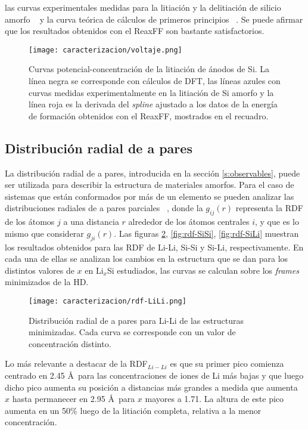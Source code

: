 las curvas experimentales medidas para la litiación y la delitiación de silicio
amorfo ~\cite{hatchard2004} y la curva teórica de cálculos de primeros principios 
~\cite{chevrier2009}. Se puede afirmar que los resultados obtenidos con el ReaxFF 
son bastante satisfactorios.
\begin{figure}[th]
    \centering
    \texttt{[image: caracterizacion/voltaje.png]}
    \caption{Curvas potencial-concentración de la litiación de ánodos de Si.
    La línea negra se corresponde con cálculos de DFT, las líneas azules con 
    curvas medidas experimentalmente en la litiación de Si amorfo y la línea 
    roja es la derivada del \textit{spline} ajustado a los datos de la energía 
    de formación obtenidos con el ReaxFF, mostrados en el recuadro.}
    \label{fig:voltaje}
\end{figure}

\subsection{Distribución radial de a pares}

La distribución radial de a pares, introducida en la sección \ref{s:observables},
puede ser utilizada para describir la estructura de materiales amorfos. Para el 
caso de sistemas que están conformados por más de un elemento se pueden analizar 
las distribuciones radiales de a pares parciales ~\cite{lamparter1995}, donde la 
$g_{ij}(r)$ representa la RDF de los átomos $j$ a una distancia $r$ alrededor de 
los átomos centrales $i$, y que es lo mismo que considerar $g_{ji}(r)$. Las 
figuras \ref{fig:rdf-LiLi}, \ref{fig:rdf-SiSi}, \ref{fig:rdf-SiLi} muestran los
resultados obtenidos para las RDF de Li-Li, Si-Si y Si-Li, respectivamente. En
cada una de ellas se analizan los cambios en la estructura que se dan para los
distintos valores de $x$ en Li$_x$Si estudiados, las curvas se calculan sobre los
\textit{frames} minimizados de la HD.

\begin{figure}[h!]
    \centering
    \texttt{[image: caracterizacion/rdf-LiLi.png]}
    \caption{Distribución radial de a pares para Li-Li de las estructuras 
    minimizadas. Cada curva se corresponde con un valor de concentración 
    distinto.}
    \label{fig:rdf-LiLi}
\end{figure}
Lo más relevante a destacar de la RDF$_{Li-Li}$ es que su primer pico comienza 
centrado en 2.45 \AA\ para las concentraciones de iones de Li más bajas y que 
luego dicho pico aumenta su posición a distancias más grandes a medida que aumenta 
$x$ hasta permanecer en 2.95 \AA\ para $x$ mayores a 1.71. La altura de este pico
aumenta en un 50\% luego de la litiación completa, relativa a la menor 
concentración.

